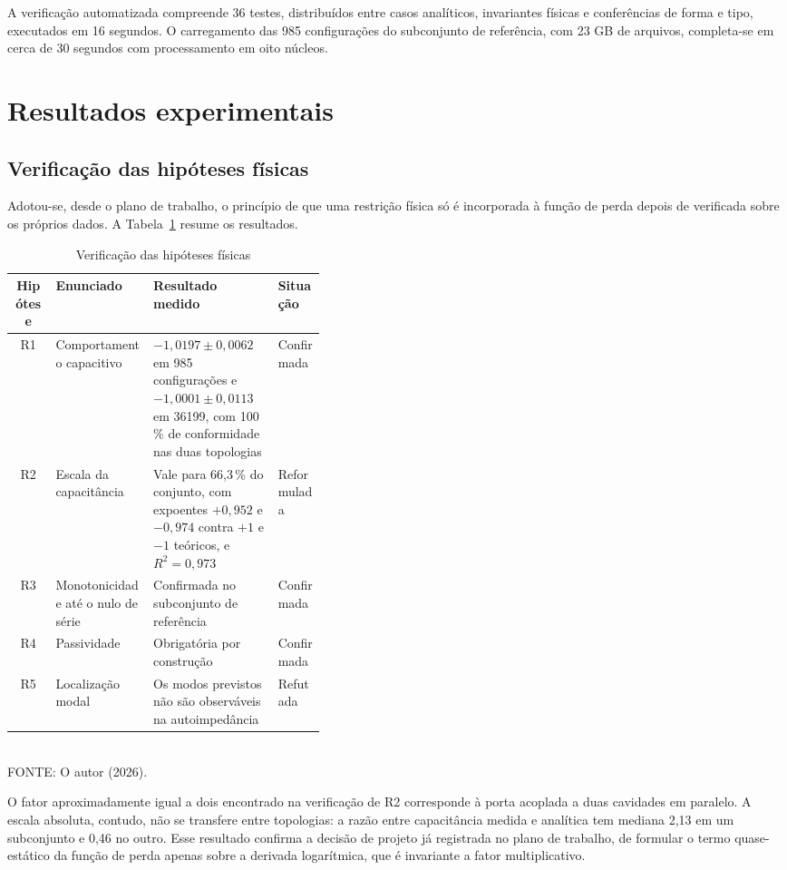 A verificação automatizada compreende 36 testes, distribuídos entre casos
analíticos, invariantes físicas e conferências de forma e tipo, executados em
16 segundos. O carregamento das 985 configurações do subconjunto de referência,
com 23 GB de arquivos, completa-se em cerca de 30 segundos com processamento em
oito núcleos.

\section{Resultados experimentais}
\label{sec:resultados}

\subsection{Verificação das hipóteses físicas}
\label{subsec:hipoteses}

Adotou-se, desde o plano de trabalho, o princípio de que uma restrição física só
é incorporada à função de perda depois de verificada sobre os próprios dados. A
Tabela~\ref{tab:hipoteses} resume os resultados.

\begin{table}[htb]
\centering
\caption{Verificação das hipóteses físicas}
\label{tab:hipoteses}
\footnotesize
\begin{tabular}{@{}clp{0.40\linewidth}l@{}}
\toprule
Hipótese & Enunciado & Resultado medido & Situação \\
\midrule
R1 & Comportamento capacitivo & $-1{,}0197 \pm 0{,}0062$ em 985 configurações e
$-1{,}0001 \pm 0{,}0113$ em 36199, com 100\,\% de conformidade nas duas
topologias & Confirmada \\
R2 & Escala da capacitância & Vale para 66,3\,\% do conjunto, com expoentes
$+0{,}952$ e $-0{,}974$ contra $+1$ e $-1$ teóricos, e $R^2 = 0{,}973$ &
Reformulada \\
R3 & Monotonicidade até o nulo de série & Confirmada no subconjunto de
referência & Confirmada \\
R4 & Passividade & Obrigatória por construção & Confirmada \\
R5 & Localização modal & Os modos previstos não são observáveis na
autoimpedância & Refutada \\
\bottomrule
\end{tabular}
\vspace{0.3em}
\\{\footnotesize FONTE: O autor (2026).}
\end{table}

O fator aproximadamente igual a dois encontrado na verificação de R2 corresponde
à porta acoplada a duas cavidades em paralelo. A escala absoluta, contudo, não se
transfere entre topologias: a razão entre capacitância medida e analítica tem
mediana 2,13 em um subconjunto e 0,46 no outro. Esse resultado confirma a decisão
de projeto já registrada no plano de trabalho, de formular o termo quase-estático
da função de perda apenas sobre a derivada logarítmica, que é invariante a fator
multiplicativo.


